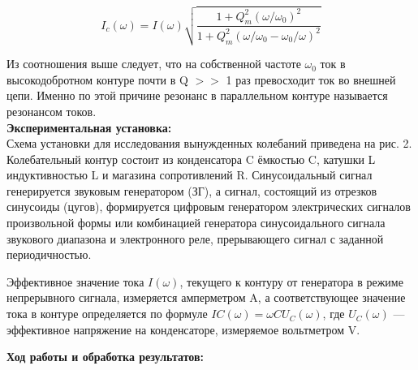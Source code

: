 \documentclass[a4paper, 12pt]{article}%
\begin{document}
	
	$$ I_c(\omega) = I(\omega) \sqrt{\frac{1 + Q_m^2(\omega/\omega_0)^2}{1 + Q_m^2(\omega/\omega_0 - \omega_0/\omega)^2}}$$
	
	
	Из соотношения выше следует, что на собственной частоте $\omega_0$ ток в
	высокодобротном контуре почти в Q $>>$ 1 раз превосходит ток во внешней цепи. Именно по этой причине резонанс в параллельном контуре
	называется резонансом токов.\\
	
	
	\textbf{Экспериментальная установка: }\\
	Схема установки для исследования вынужденных колебаний приведена на рис. 2. Колебательный контур состоит из конденсатора C ёмкостью C, катушки L индуктивностью L и магазина сопротивлений R.
	Синусоидальный сигнал генерируется звуковым генератором (ЗГ), а сигнал, состоящий из отрезков синусоиды (цугов), формируется цифровым
	генератором электрических сигналов произвольной формы или комбинацией генератора синусоидального сигнала звукового диапазона и электронного реле, прерывающего сигнал с заданной периодичностью.
	
	Эффективное значение тока $I(\omega)$, текущего к контуру от генератора в режиме непрерывного сигнала, измеряется амперметром A, а
	соответствующее значение тока в контуре определяется по формуле
	$IC(\omega) = \omega CU_C(\omega)$, где $U_C(\omega)$ — эффективное напряжение на конденсаторе, измеряемое вольтметром V.
	
	\begin{figure}[h]
	\end{figure}
	
	\newpage
	
	\textbf{Ход работы и обработка результатов: }\\
	
\end{document}
